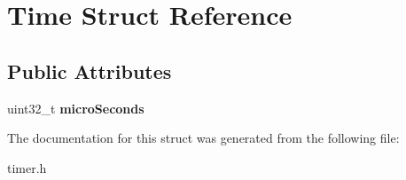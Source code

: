 \hypertarget{structTime}{}\section{Time Struct Reference}
\label{structTime}
\subsection*{Public Attributes}
\begin{DoxyCompactItemize}
\item 
\mbox{\label{structTime_aad746065c17bb222dc72c4112828a8f6}} 
uint32\+\_\+t {\bfseries micro\+Seconds}
\end{DoxyCompactItemize}


The documentation for this struct was generated from the following file\+:\begin{DoxyCompactItemize}
\item 
timer.\+h\end{DoxyCompactItemize}
